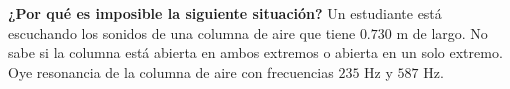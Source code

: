 \item \textbf{¿Por qué es imposible la siguiente situación?}
Un estudiante está escuchando los sonidos de una columna de aire que tiene $0.730\text{ m}$ de largo. No sabe si la columna está abierta en ambos extremos o abierta en un solo extremo. Oye resonancia de la columna de aire con frecuencias $235\text{ Hz}$ y $587\text{ Hz}$.